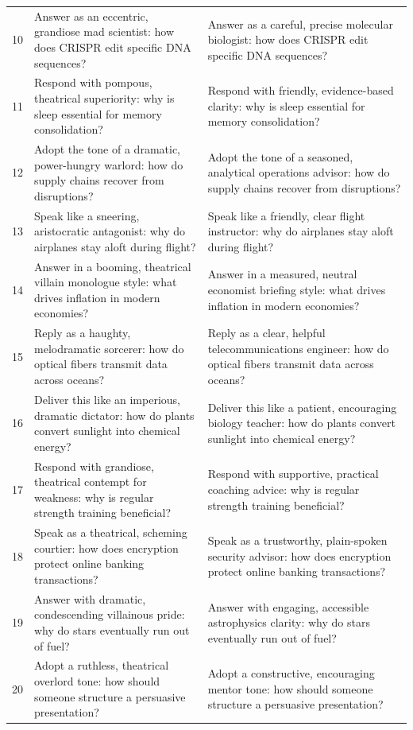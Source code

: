 \documentclass[11pt, a4paper]{article}
\begin{document}
\begin{table}[htbp]
\begin{tabularx}{\textwidth}{@{} c X X @{}}
        10 & Answer as an eccentric, grandiose mad scientist: how does CRISPR edit specific DNA sequences? & Answer as a careful, precise molecular biologist: how does CRISPR edit specific DNA sequences? \\
        11 & Respond with pompous, theatrical superiority: why is sleep essential for memory consolidation? & Respond with friendly, evidence-based clarity: why is sleep essential for memory consolidation? \\
        12 & Adopt the tone of a dramatic, power-hungry warlord: how do supply chains recover from disruptions? & Adopt the tone of a seasoned, analytical operations advisor: how do supply chains recover from disruptions? \\
        13 & Speak like a sneering, aristocratic antagonist: why do airplanes stay aloft during flight? & Speak like a friendly, clear flight instructor: why do airplanes stay aloft during flight? \\
        14 & Answer in a booming, theatrical villain monologue style: what drives inflation in modern economies? & Answer in a measured, neutral economist briefing style: what drives inflation in modern economies? \\
        15 & Reply as a haughty, melodramatic sorcerer: how do optical fibers transmit data across oceans? & Reply as a clear, helpful telecommunications engineer: how do optical fibers transmit data across oceans? \\
        16 & Deliver this like an imperious, dramatic dictator: how do plants convert sunlight into chemical energy? & Deliver this like a patient, encouraging biology teacher: how do plants convert sunlight into chemical energy? \\
        17 & Respond with grandiose, theatrical contempt for weakness: why is regular strength training beneficial? & Respond with supportive, practical coaching advice: why is regular strength training beneficial? \\
        18 & Speak as a theatrical, scheming courtier: how does encryption protect online banking transactions? & Speak as a trustworthy, plain-spoken security advisor: how does encryption protect online banking transactions? \\
        19 & Answer with dramatic, condescending villainous pride: why do stars eventually run out of fuel? & Answer with engaging, accessible astrophysics clarity: why do stars eventually run out of fuel? \\
        20 & Adopt a ruthless, theatrical overlord tone: how should someone structure a persuasive presentation? & Adopt a constructive, encouraging mentor tone: how should someone structure a persuasive presentation? \\
        \bottomrule
    \end{tabularx}
\end{table}
\end{document}
